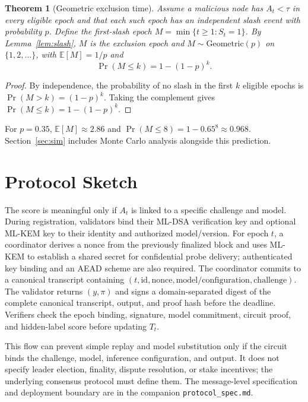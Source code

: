 \documentclass[conference]{IEEEtran}
\newtheorem{theorem}{Theorem}
\begin{document}
\begin{theorem}[Geometric exclusion time]
\label{thm:geom}
Assume a malicious node has $A_t<\tau$ in every eligible epoch and that each such epoch has an independent slash event with probability $p$. Define the first-slash epoch $M=\min\{t\geq1:S_t=1\}$. By Lemma~\ref{lem:slash}, $M$ is the exclusion epoch and $M\sim\mathrm{Geometric}(p)$ on $\{1,2,\ldots\}$, with $\mathbb{E}[M]=1/p$ and
\[
  \Pr(M\le k)=1-(1-p)^k.
\]
\end{theorem}

\begin{proof}
By independence, the probability of no slash in the first $k$ eligible epochs is $\Pr(M>k)=(1-p)^k$. Taking the complement gives $\Pr(M\leq k)=1-(1-p)^k$.
\end{proof}

For $p=0.35$, $\mathbb{E}[M]\approx 2.86$ and $\Pr(M\le 8)=1-0.65^8\approx 0.968$. Section~\ref{sec:sim} includes Monte Carlo analysis alongside this prediction.

\section{Protocol Sketch}
\label{sec:protocol}

The score is meaningful only if $A_t$ is linked to a specific challenge and model. During registration, validators bind their ML-DSA verification key and optional ML-KEM key to their identity and authorized model/version. For epoch $t$, a coordinator derives a nonce from the previously finalized block and uses ML-KEM to establish a shared secret for confidential probe delivery; authenticated key binding and an AEAD scheme are also required. The coordinator commits to a canonical transcript containing $(t,\mathrm{id},\mathrm{nonce},\mathrm{model/configuration},\mathrm{challenge})$. The validator returns $(y,\pi)$ and signs a domain-separated digest of the complete canonical transcript, output, and proof hash before the deadline. Verifiers check the epoch binding, signature, model commitment, circuit proof, and hidden-label score before updating $T_t$.

This flow can prevent simple replay and model substitution only if the circuit binds the challenge, model, inference configuration, and output. It does not specify leader election, finality, dispute resolution, or stake incentives; the underlying consensus protocol must define them. The message-level specification and deployment boundary are in the companion \texttt{protocol\_spec.md}.
\end{document}
